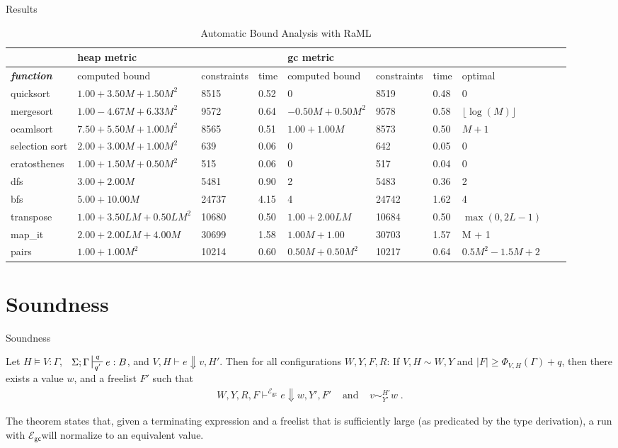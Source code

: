 \documentclass{beamer}
\newcommand{\ms}[1]{\ensuremath{\mathsf{#1}}}
\newcounter{rule}
\newcommand{\veq}[4]{#3 \sim^{#1}_{#2} #4}
\newcommand{\gcSem}{\ensuremath{\mathcal{E}_{\ms{gc}}}}
\theoremstyle{definition}
\begin{document}
\begin{frame}[fragile]{Results}
\begin{table}[]
	\begin{adjustbox}{width=1\textwidth, center=\textwidth}
  \begin{tabular}{@{}llllllllll@{}}
    \toprule
		 & \multicolumn{3}{l}{heap metric} & \multicolumn{3}{l}{gc metric} &  \\ \midrule
		 \textit{\textbf{function}} & computed bound & constraints & time & computed bound &  constraints & time & optimal \\
		 quicksort & $1.00 + 3.50M + 1.50M^2$ & 8515 & 0.52 & 0 & 8519 & 0.48 & 0 \\
		 mergesort & $1.00 - 4.67M + 6.33M^2$ & 9572 & 0.64 & $-0.50M + 0.50M^2$ & 9578 & 0.58 & $\lfloor \log(M) \rfloor$ \\
		 ocamlsort & $7.50 + 5.50M + 1.00M^2$ & 8565 & 0.51 & $1.00 + 1.00M$ & 8573 & 0.50 & $M+1$ \\
		 selection sort & $2.00 + 3.00M + 1.00M^2$ & 639 & 0.06 & 0 & 642 & 0.05 & 0 \\
		 eratosthenes & $1.00 + 1.50M + 0.50M^2$ & 515 & 0.06 & 0 & 517 & 0.04 & 0 \\
		 dfs & $3.00 + 2.00M$ & 5481 & 0.90 & 2 & 5483 & 0.36 & 2 \\
		 bfs & $5.00 + 10.00M$ & 24737 & 4.15 & 4 & 24742 & 1.62 & 4 \\
		 transpose & $1.00 + 3.50LM + 0.50LM^2$ & 10680 & 0.50 & $1.00 + 2.00LM$ & 10684 & 0.50 & $\max{(0,2L-1)}$ \\
		 map\_it & $2.00 + 2.00LM + 4.00M$ & 30699 & 1.58 & $1.00M + 1.00$ & 30703 & 1.57 & M + 1 \\
		 pairs & $1.00 + 1.00M^2$ & 10214 & 0.60 & $0.50M + 0.50M^2$ & 10217 & 0.64 & $0.5M^2-1.5M+2$ \\ \midrule
	\end{tabular}
	\end{adjustbox}
	\caption{Automatic Bound Analysis with RaML}
\label{table:bounds}
\end{table}
\end{frame}


\section{Soundness}
\begin{frame}{Soundness}
\begin{theorem}[Soundness]
\label{itm:soundness} Let $H \vDash V {:} \Gamma$, $\;\; \Sigma; \Gamma \sststile{q'}{q} e : B$,
and $V,H \vdash e \Downarrow v, H'$.
Then for all configurations $W,Y,F,R$:
If $V,H \sim W,Y$ and $|F| \ge \Phi_{V,H}(\Gamma) + q$,
then there exists a value $w$, and a freelist $F'$ such that
$$
\begin{array}{ccc}
	W,Y,R,F \vdash^{\gcSem} e \Downarrow w, Y', F'  & \text{ and } & \veq{H'}{Y'}{v}{w} \; .
\end{array}
$$
\end{theorem}
The theorem states that,
given a terminating expression
and a freelist that is sufficiently large (as predicated by the type derivation), 
a run with \gcSem will normalize to an equivalent value.
\end{frame}
\end{document}
